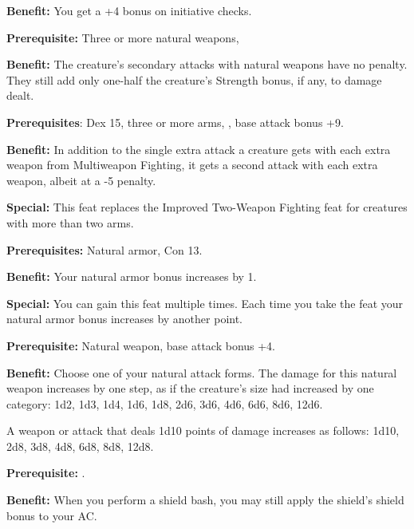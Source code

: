 \textbf{Benefit:} You get a +4 bonus on initiative checks.


\textbf{Prerequisite:} Three or more natural weapons, 

\textbf{Benefit:} The creature's secondary attacks with natural weapons have no penalty. They still add only one-half the creature's Strength bonus, if any, to damage dealt.


\textbf{Prerequisites}: Dex 15, three or more arms, , base 
attack bonus +9.

\textbf{Benefit:} In addition to the single extra attack a creature gets with each extra weapon from Multiweapon Fighting, it gets a second attack with each extra weapon, albeit at a -5 penalty.

\textbf{Special:} This feat replaces the Improved Two-Weapon Fighting feat for creatures with more than two arms.


\textbf{Prerequisites:} Natural armor, Con 13.

\textbf{Benefit:} Your natural armor bonus increases by 1.

\textbf{Special:} You can gain this feat multiple times. Each time you take the feat your natural armor bonus increases by another point.


\textbf{Prerequisite:} Natural weapon, base attack bonus +4.

\textbf{Benefit:} Choose one of your natural attack forms. The damage for this natural weapon increases by one step, as if the creature's size had increased by one category: 1d2, 1d3, 1d4, 1d6, 1d8, 2d6, 3d6, 4d6, 6d6, 8d6, 12d6. 

A weapon or attack that deals 1d10 points of damage increases as follows: 1d10, 2d8, 3d8, 4d8, 6d8, 8d8, 12d8.


\textbf{Prerequisite:} .

\textbf{Benefit:} When you perform a shield bash, you may still apply the shield's shield bonus to your AC.


